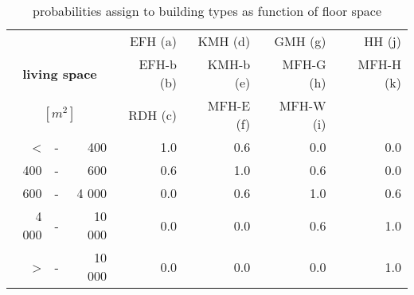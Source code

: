 \begin{table}[htb]
  \centering
  \caption{probabilities assign to building types as function of floor space}
  \label{tab:pls}
  \begin{tabular}{rcr rrrr}
    \toprule
    &&&
    EFH (a)  & KMH (d)   & GMH (g)   & HH (j) \\ 
    \multicolumn{3}{c}{\textbf{living space}}& 
    EFH-b (b)& KMH-b (e)& MFH-G (h)& MFH-H (k)\\
    \multicolumn{3}{c}{$[m^2]$}& 
    RDH (c)   & MFH-E (f)& MFH-W (i)& \\
    \midrule
\textless &-&    400     & 1.0 & 0.6 & 0.0 & 0.0 \\
      400 &-&    600     & 0.6 & 1.0 & 0.6 & 0.0 \\
      600 &-&  4 000     & 0.0 & 0.6 & 1.0 & 0.6 \\
    4 000 &-& 10 000     & 0.0 & 0.0 & 0.6 & 1.0 \\
\textgreater  &-& 10 000     & 0.0 & 0.0 & 0.0 & 1.0 \\
    \bottomrule
  \end{tabular}
\end{table}